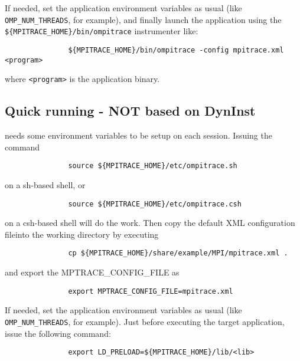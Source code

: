 If needed, set the application environment variables as usual (like {\tt OMP\_NUM\_THREADS}, for example), and finally launch the application using the {\tt \$\{MPITRACE\_HOME\}/bin/ompitrace} instrumenter like:

\begin{verbatim}
               ${MPITRACE_HOME}/bin/ompitrace -config mpitrace.xml <program>
\end{verbatim}

where {\tt <program>} is the application binary.

\subsection{Quick running \TRACE - NOT based on DynInst}\label{subsec:RunningTraceNOTDynInst}

\TRACE needs some environment variables to be setup on each session. Issuing the command 

\begin{verbatim}
               source ${MPITRACE_HOME}/etc/ompitrace.sh
\end{verbatim}

on a sh-based shell, or 

\begin{verbatim}
               source ${MPITRACE_HOME}/etc/ompitrace.csh
\end{verbatim}

on a csh-based shell will do the work. Then copy the default XML configuration file\footnotemark[1] into the working directory by executing

\begin{verbatim}
               cp ${MPITRACE_HOME}/share/example/MPI/mpitrace.xml .
\end{verbatim}

and export the {MPTRACE\_CONFIG\_FILE} as

\begin{verbatim}
               export MPTRACE_CONFIG_FILE=mpitrace.xml
\end{verbatim}

If needed, set the application environment variables as usual (like {\tt OMP\_NUM\_THREADS}, for example). Just before executing the target application, issue the following command:

\begin{verbatim}
               export LD_PRELOAD=${MPITRACE_HOME}/lib/<lib>
\end{verbatim}

